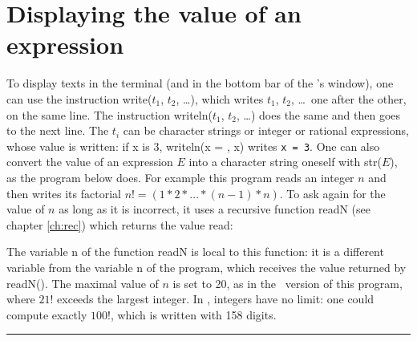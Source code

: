 \section{Displaying the value of an expression}
To display texts in the terminal (and in the bottom bar of the \robot's
window), one
can use the instruction {\idt write(}$t_1${\idt ,} $t_2${\idt ,} \ldots{\idt )}, which writes
$t_1$, $t_2$, \ldots\ one
after the other, on the same line. The instruction
{\idt writeln(}$t_1${\idt ,} $t_2${\idt ,} \ldots{\idt )} does the same and then goes to the next line.
The $t_i$ can be character strings or integer or rational expressions,
whose value is written: if {\idt x} is 3, {\idt writeln(}{\cha {}x = }{\idt , x)}
writes {\tt x = 3}. One can also convert the value of an expression $E$ into a character string oneself
with {\idt str(}$E${\idt )}, as the program below does. For example
this program reads
an integer $n$
and then writes its factorial $n! = (1 \ast 2 \ast \ldots \ast (n - 1) \ast n)$. To ask again
for the value of $n$ as long as it is incorrect, it uses a recursive function {\idt readN}
(see chapter \ref{ch:rec}) which returns the value read:


\noindent The variable {\idt n} of the function {\idt readN} is local to this function: it is
a different variable from the variable {\idt n} of the program, which receives the value returned by
{\idt readN()}. The maximal value of $n$ is set to 20, as in the \ocaml\ version of
this program, where $21!$ exceeds the largest integer. In \python, integers have no limit:
one could compute exactly $100!$, which is written with 158 digits.
\medskip

\noindent \rule{137mm}{0.1mm}\par\nopagebreak %

